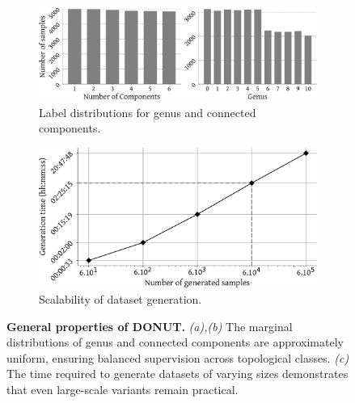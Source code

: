 \begin{figure}[t]
  \centering
  \begin{subfigure}[t]{0.66\linewidth}
    \centering
    \includegraphics[width=\linewidth]{figs/topogen/components_genus_hist.pdf}
    \caption{Label distributions for genus and connected components.}
    \label{fig:topogen-gen-comp-hist}
  \end{subfigure}%
  \hfill
  \begin{subfigure}[t]{0.33\linewidth}
    \centering
    \includegraphics[width=\linewidth]{figs/topogen/generation_time.pdf}
    \caption{Scalability of dataset generation.}
    \label{fig:topogen-gen-time}
  \end{subfigure}
  \caption{\textbf{General properties of DONUT.} \textit{(a),(b)} The marginal distributions of genus and connected components are approximately uniform, ensuring balanced supervision across topological classes. \textit{(c)} The time required to generate datasets of varying sizes demonstrates that even large-scale variants remain practical.}
  \label{fig:topogen-properties}
\end{figure}



